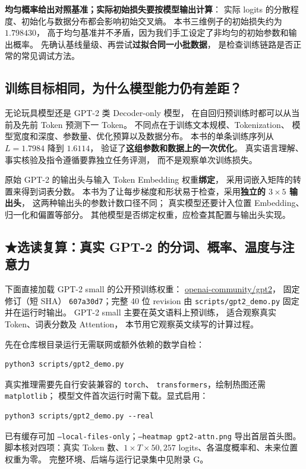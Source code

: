 \textbf{均匀概率给出对照基准；实际初始损失要按模型输出计算}：
实际 logits 的分散程度、初始化与数据分布都会影响初始交叉熵。
本书三维例子的初始损失约为 $1.798430$，
高于均匀基准并不矛盾，因为我们手工设定了非均匀的初始参数和输出概率。
先确认基线量级、再尝试\textbf{过拟合同一小批数据}，
是检查训练链路是否正常的常见调试方法。

\subsection{训练目标相同，为什么模型能力仍有差距？}

无论玩具模型还是 GPT-2 类 Decoder-only 模型，
在自回归预训练时都可以从当前及先前 Token 预测下一 Token。
不同点在于训练文本规模、Tokenization、
模型宽度和深度、参数量、优化预算以及数据分布。
本书的单条训练序列从 $L=1.7984$ 降到 $1.6114$，
验证了\textbf{这组参数和数据上的一次优化}。
真实语言理解、事实核验及指令遵循要靠独立任务评测，
而不是观察单次训练损失。

原始 GPT-2 的输出头与输入 Token Embedding 权重\textbf{绑定}，
采用词嵌入矩阵的转置来得到词表分数。
本书为了让每步梯度和形状易于检查，采用\textbf{独立的 $3\times5$ 输出头}，
这两种输出头的参数计数口径不同；
真实模型还要计入位置 Embedding、归一化和偏置等部分。
其他模型是否绑定权重，应检查其配置与输出头实现。

\subsection{\texorpdfstring{{\symboliconfont ★}}{★}选读复算：真实 GPT-2 的分词、概率、温度与注意力}

下面直接加载 GPT-2 small 的公开预训练权重：
\href{https://huggingface.co/openai-community/gpt2}{openai-community/gpt2}，
固定修订（短 SHA）
\texttt{607a30d7}；完整 40 位 revision
由 \texttt{scripts/gpt2\_demo.py} 固定并在运行时输出。
GPT-2 small 主要在英文语料上预训练，
适合观察真实 Token、词表分数及 Attention，
本节用它观察英文续写的计算过程。

先在仓库根目录运行无需联网或额外依赖的数学自检：
\begin{verbatim}
python3 scripts/gpt2_demo.py
\end{verbatim}
真实推理需要先自行安装兼容的 \texttt{torch}、
\texttt{transformers}，绘制热图还需 \texttt{matplotlib}；
模型文件首次运行时需下载。显式启用：
\begin{verbatim}
python3 scripts/gpt2_demo.py --real
\end{verbatim}
已有缓存可加 \texttt{--local-files-only}；\texttt{--heatmap gpt2-attn.png} 导出首层首头图。
脚本核对四项：真实 Token 数、$1\times T\times50{,}257$ logits、各温度概率和、未来位置权重为零。
完整环境、后端与运行记录集中见附录 G。

